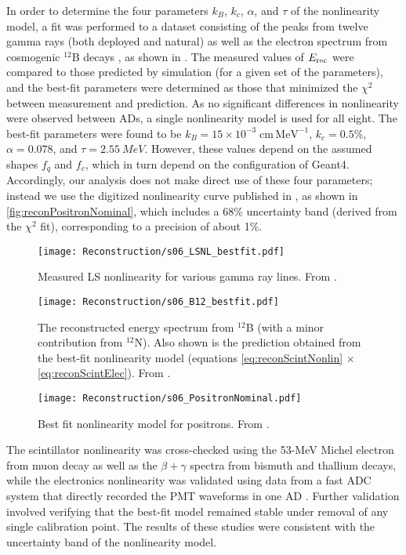 \documentclass[../thesis.tex]{subfiles}
\begin{document}
In order to determine the four parameters $k_B$, $k_c$, $\alpha$, and $\tau$ of the nonlinearity model, a fit was performed to a dataset consisting of the peaks from twelve gamma rays (both deployed and natural) as well as the electron spectrum from cosmogenic $^{12}$B decays \cite{NonlinearityPaper}, as shown in . The measured values of $E_\mathrm{rec}$ were compared to those predicted by simulation (for a given set of the parameters), and the best-fit parameters were determined as those that minimized the $\chi^2$ between measurement and prediction. As no significant differences in nonlinearity were observed between ADs, a single nonlinearity model is used for all eight. The best-fit parameters were found to be $k_B = 15 \times 10^{-3}\;\mathrm{cm\, MeV^{-1}}$, $k_c = 0.5\%$, $\alpha = 0.078$, and $\tau = \SI{2.55}{MeV}$. However, these values depend on the assumed shapes $f_q$ and $f_c$, which in turn depend on the configuration of Geant4. Accordingly, our analysis does not make direct use of these four parameters; instead we use the digitized nonlinearity curve published in \cite{NonlinearityPaper}, as shown in \autoref{fig:reconPositronNominal}, which includes a 68\% uncertainty band (derived from the $\chi^2$ fit), corresponding to a precision of about 1\%.

\begin{figure}[h]
  \texttt{[image: Reconstruction/s06\_LSNL\_bestfit.pdf]}
  \caption{Measured LS nonlinearity for various gamma ray lines. From \cite{NonlinearityPaper}.}
  \label{fig:reconGammaLines}
\end{figure}

\begin{figure}[h]
  \texttt{[image: Reconstruction/s06\_B12\_bestfit.pdf]}
  \caption{The reconstructed energy spectrum from $^{12}$B (with a minor contribution from $^{12}$N). Also shown is the prediction obtained from the best-fit nonlinearity model (equations \autoref{eq:reconScintNonlin} $\times$ \autoref{eq:reconScintElec}). From \cite{NonlinearityPaper}.}
  \label{fig:reconB12}
\end{figure}

\begin{figure}[h]
  \texttt{[image: Reconstruction/s06\_PositronNominal.pdf]}
  \caption{Best fit nonlinearity model for positrons. From \cite{NonlinearityPaper}.}
  \label{fig:reconPositronNominal}
\end{figure}

The scintillator nonlinearity was cross-checked using the 53-MeV Michel electron from muon decay as well as the $\beta+\gamma$ spectra from bismuth and thallium decays, while the electronics nonlinearity was validated using data from a fast ADC system that directly recorded the PMT waveforms in one AD \cite{HUANG201848}. Further validation involved verifying that the best-fit model remained stable under removal of any single calibration point. The results of these studies were consistent with the uncertainty band of the nonlinearity model.
\end{document}
